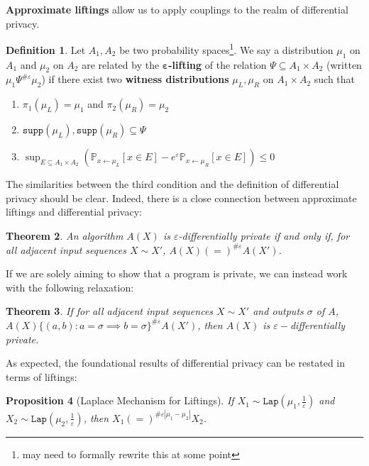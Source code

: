 \documentclass[12pt]{article}
\newcommand{\PP}{\mathbb{P}}
\newcommand{\Lap}{\texttt{Lap}}
\newcommand{\supp}{\texttt{supp}}
\newtheorem{thm}{Theorem}[section]
\newtheorem{prop}[thm]{Proposition}
\theoremstyle{definition}
\newtheorem{defn}[thm]{Definition}
\begin{document}
\textbf{Approximate liftings} \cite{BartheOlmedo2013,bartheKopfOlmedo2012ProbabilisticRelationalReasoningforDifferentialPriv,HsuThesis2017,BartheEtAl2016} allow us to apply couplings to the realm of differential privacy. 

\begin{defn}
    Let $A_1, A_2$ be two probability spaces\footnote{may need to formally rewrite this at some point}. We say a distribution $\mu_1$ on $A_1$ and $\mu_2$ on $A_2$ are related by the $\mathbf{\varepsilon}$\textbf{-lifting} of the relation $\Psi\subseteq A_1\times A_2$ (written $\mu_1\Psi^{\#\varepsilon}\mu_2$) if there exist two \textbf{witness distributions} $\mu_L, \mu_R$ on $A_1\times A_2$ such that\begin{enumerate}
        \item $\pi_1(\mu_L) = \mu_1$ and $\pi_2(\mu_R) = \mu_2$
        \item $\supp(\mu_L), \supp(\mu_R)\subseteq \Psi$
        \item $\sup_{E\subseteq A_1\times A_2}(\PP_{x\gets \mu_L}[x\in E]- e^\varepsilon \PP_{x\gets \mu_R}[x\in E])\leq 0$
    \end{enumerate}
\end{defn}

The similarities between the third condition and the definition of differential privacy should be clear. Indeed, there is a close connection between approximate liftings and differential privacy:

\begin{thm}
    An algorithm $A(X)$ is $\varepsilon$-differentially private if and only if, for all adjacent input sequences $X\sim X'$, $A(X)(=)^{\#\varepsilon}A(X')$.
\end{thm}

If we are solely aiming to show that a program is private, we can instead work with the following relaxation: 

\begin{thm}\label{implicationcouplingthm}
    If for all adjacent input sequences $X\sim X'$ and outputs $\sigma$ of $A$, $A(X)\{(a, b): a=\sigma\implies b=\sigma\}^{\#\varepsilon}A(X')$, then $A(X)$ is $\varepsilon-$differentially private.
\end{thm}

As expected, the foundational results of differential privacy can be restated in terms of liftings:

\begin{prop}[Laplace Mechanism for Liftings]
    If $X_1\sim\Lap(\mu_1, \frac{1}{\varepsilon})$ and $X_2\sim\Lap(\mu_2, \frac{1}{\varepsilon})$, then $X_1(=)^{\#\varepsilon|\mu_1-\mu_2|}X_2$.
\end{prop}
\end{document}
